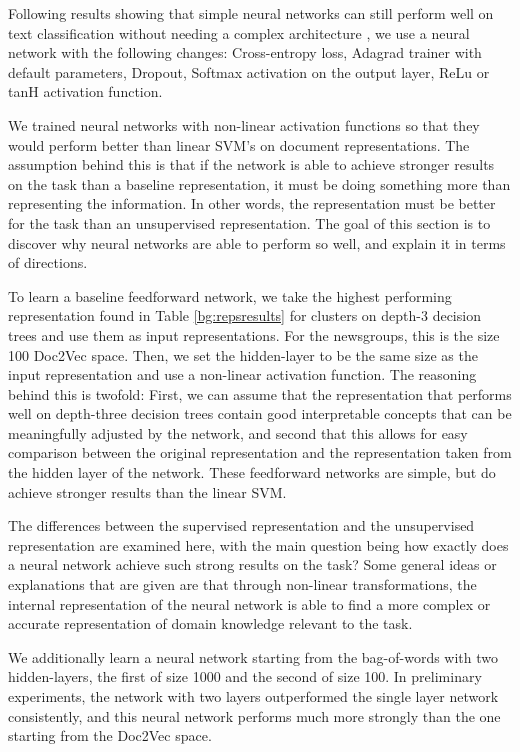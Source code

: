  Following results showing that simple neural networks can still perform well on text classification without needing a complex architecture  \cite{Lakhotia2018} \cite{Nam2014}, we use a neural network with the following changes: Cross-entropy loss, Adagrad trainer with default parameters, Dropout, Softmax activation on the output layer, ReLu or tanH activation function. 

We trained neural networks with non-linear activation functions so that they would  perform better than linear SVM's on  document representations. The assumption behind this is that if the network is able to achieve stronger results on the task than a baseline representation, it must be doing something more than representing the information. In other words, the representation must be better for the task than an unsupervised representation. The goal of this section is to discover why neural networks are able to perform so well, and explain it in terms of directions. 

To learn a baseline feedforward network, we take the highest performing representation found in Table \ref{bg:repsresults} for clusters on depth-3 decision trees and use them as input representations.   For the newsgroups, this is the size 100 Doc2Vec space. Then, we set the hidden-layer to be the same size as the input representation and use a non-linear activation function.  The reasoning behind this is twofold: First, we can assume that the representation that performs well on depth-three decision trees contain good interpretable concepts that can be meaningfully adjusted by the network, and second that this allows for easy comparison between the original representation and the representation taken from the hidden layer of the network. These feedforward networks are simple, but do achieve stronger results than the linear SVM.  

The  differences between the supervised representation and the unsupervised representation are examined here, with the main question being how exactly does a neural network achieve such strong results on the task? Some general ideas or explanations that are given are that through non-linear transformations, the internal representation of the neural network is able to find a more complex or accurate representation of domain knowledge relevant to the task.


We additionally learn a neural network starting from the bag-of-words  with two hidden-layers, the first of size 1000 and the second of size 100. In preliminary experiments, the network with two layers outperformed the single layer network consistently, and this neural network performs much more strongly than the one starting from the Doc2Vec space. 


